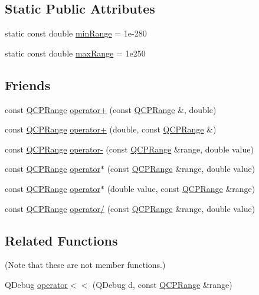\subsection*{Static Public Attributes}
\begin{DoxyCompactItemize}
\item 
static const double \hyperlink{classQCPRange_ab46d3bc95030ee25efda41b89e2b616b}{min\+Range} = 1e-\/280
\item 
static const double \hyperlink{classQCPRange_a5ca51e7a2dc5dc0d49527ab171fe1f4f}{max\+Range} = 1e250
\end{DoxyCompactItemize}
\subsection*{Friends}
\begin{DoxyCompactItemize}
\item 
const \hyperlink{classQCPRange}{Q\+C\+P\+Range} \hyperlink{classQCPRange_af53ea6fb823a4a5897162b865841de04}{operator+} (const \hyperlink{classQCPRange}{Q\+C\+P\+Range} \&, double)
\item 
const \hyperlink{classQCPRange}{Q\+C\+P\+Range} \hyperlink{classQCPRange_a9fb2e9941d32001482df670c0d704977}{operator+} (double, const \hyperlink{classQCPRange}{Q\+C\+P\+Range} \&)
\item 
const \hyperlink{classQCPRange}{Q\+C\+P\+Range} \hyperlink{classQCPRange_a797f82830b516646da8873f82e39e356}{operator-\/} (const \hyperlink{classQCPRange}{Q\+C\+P\+Range} \&range, double value)
\item 
const \hyperlink{classQCPRange}{Q\+C\+P\+Range} \hyperlink{classQCPRange_a558b1248ff6a9e41fd5b2630555a8acc}{operator$\ast$} (const \hyperlink{classQCPRange}{Q\+C\+P\+Range} \&range, double value)
\item 
const \hyperlink{classQCPRange}{Q\+C\+P\+Range} \hyperlink{classQCPRange_a5cb2332f6957021f47cc768089f4f090}{operator$\ast$} (double value, const \hyperlink{classQCPRange}{Q\+C\+P\+Range} \&range)
\item 
const \hyperlink{classQCPRange}{Q\+C\+P\+Range} \hyperlink{classQCPRange_a4b366a3a21974c88e09b0d39d4a24a4b}{operator/} (const \hyperlink{classQCPRange}{Q\+C\+P\+Range} \&range, double value)
\end{DoxyCompactItemize}
\subsection*{Related Functions}
(Note that these are not member functions.) \begin{DoxyCompactItemize}
\item 
Q\+Debug \hyperlink{classQCPRange_ab4b7d434541ec2e2e00ef3764dde90d8}{operator$<$$<$} (Q\+Debug d, const \hyperlink{classQCPRange}{Q\+C\+P\+Range} \&range)
\end{DoxyCompactItemize}


